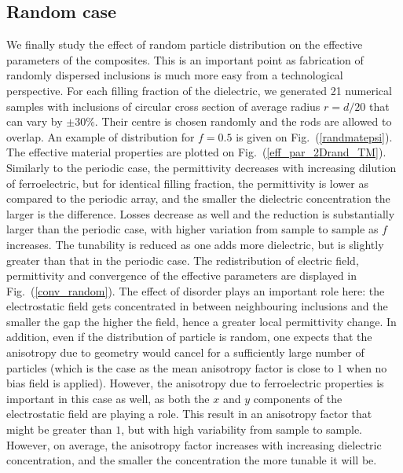 \documentclass[%
 reprint,
 amsmath,amssymb,
 aps,
]{revtex4-2}
\newcommand{\fig}[1]{Fig.~(\ref{#1})}
\begin{document}
\subsection*{Random case}
We finally study the effect of random particle distribution on the effective parameters of the
composites. This is an important point as fabrication of randomly dispersed
inclusions is much more easy from a technological perspective. For each filling fraction of the dielectric,
we generated 21 numerical samples with inclusions of circular cross section of average radius
$r=d/20$ that can vary by $\pm 30\%$. Their centre is chosen randomly and the
rods are allowed to overlap. An example of distribution for $f=0.5$ is given on \fig{randmatepsi}.
The effective material properties are plotted on \fig{eff_par_2Drand_TM}.
Similarly to the periodic case, the permittivity decreases with increasing dilution of
ferroelectric, but for identical filling fraction,
the permittivity is lower as compared to the periodic array, and the smaller the dielectric concentration the larger
is the difference. Losses decrease as well and the reduction is substantially larger
than the periodic case, with higher variation from sample to sample as $f$ increases.
The tunability is reduced as one adds more dielectric, but is slightly greater than that in the periodic case.
The redistribution of electric field, permittivity and convergence of
the effective parameters are displayed in \fig{conv_random}. The effect of
disorder plays an important role here: the electrostatic field gets concentrated
in between neighbouring inclusions and the smaller the gap the higher the field, hence
a greater local permittivity change. In addition, even if the distribution of particle is
random, one expects that the anisotropy due to geometry would cancel for a sufficiently large number
of particles (which is the case as the mean anisotropy factor is close to $1$ when no
bias field is applied). However, the anisotropy due to ferroelectric properties is
important in this case as well, as both the $x$ and $y$ components of the electrostatic field
are playing a role. This result in an anisotropy factor that might be greater than $1$,
but with high variability from sample to sample. However, on average, the anisotropy factor
increases with increasing dielectric concentration, and the smaller the concentration the more tunable
it will be.
\end{document}
